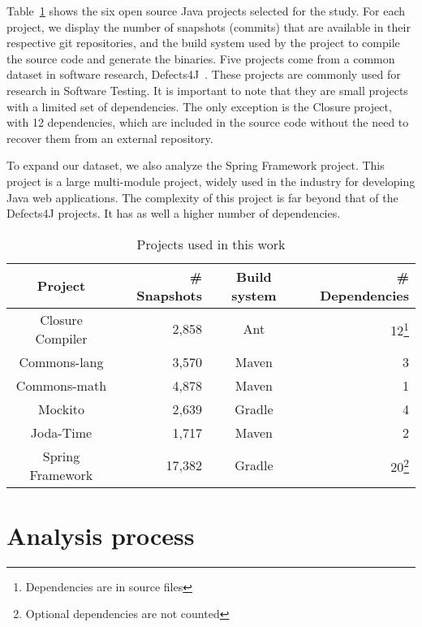 Table~\ref{table:projects} shows the six open source Java projects selected for the study.
For each project, we display the number of snapshots (commits) that are available in their respective git repositories, and the build system used by the project to compile the source code and generate the binaries.
Five projects come from a common dataset in software research, Defects4J~\cite{Just:2014:DDE:2610384.2628055}.
These projects are commonly used for research in Software Testing.
It is important to note that they are small projects with a limited set of dependencies.
The only exception is the Closure project, with 12 dependencies, which are included in the source code without the need to recover them from an external repository.

To expand our dataset, we also analyze the Spring Framework project.
This project is a large multi-module project, widely used in the industry for developing Java web applications.
The complexity of this project is far beyond that of the Defects4J projects.
It has as well a higher number of dependencies.

\begin{savenotes}
	\begin{table}
		\caption{Projects used in this work}
		\label{table:projects}
		\centering
		\begin{tabular}{crcr}
			\toprule
			\bf{Project} & \bf{\# Snapshots} & \bf{{Build system}} & \bf{\# Dependencies}\\ 
			\midrule
			Closure Compiler & 2,858 & Ant & 12\footnote{Dependencies are in source files}\\
			Commons-lang & 3,570 & Maven & 3\\
			Commons-math & 4,878 & Maven & 1\\
			Mockito & 2,639 & Gradle & 4\\
			Joda-Time & 1,717 & Maven & 2\\
			Spring Framework & 17,382 & Gradle & 20\footnote{Optional dependencies are not counted}\\
			\bottomrule
		\end{tabular}
	
	\end{table}
\end{savenotes}

\section{Analysis process}

